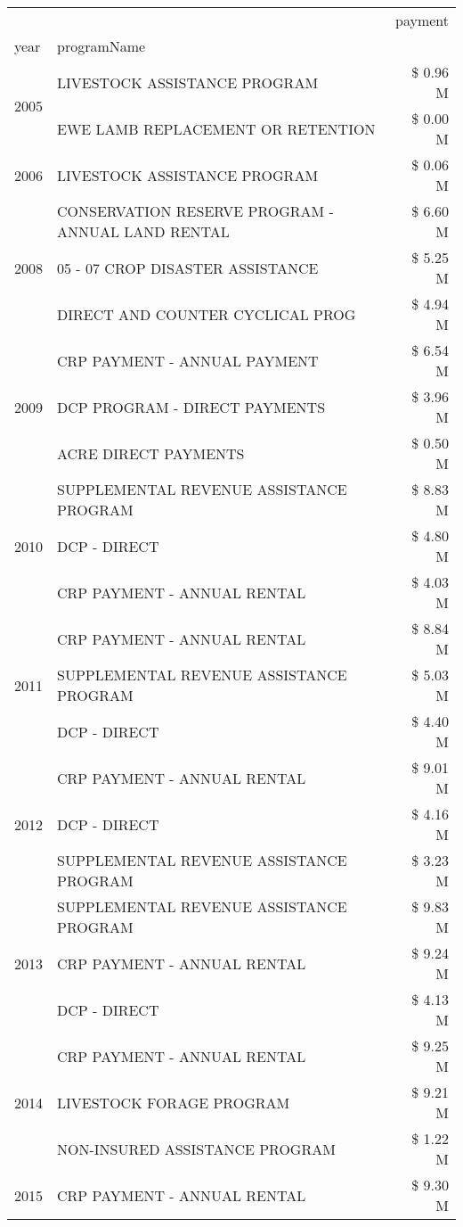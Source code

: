 \begin{tabular}{llr}
\toprule
 &  & payment \\
year & programName &  \\
\midrule
\multirow[t]{2}{*}{2005} & LIVESTOCK ASSISTANCE PROGRAM & \$ 0.96 M \\
 & EWE LAMB REPLACEMENT OR RETENTION & \$ 0.00 M \\
\cline{1-3}
2006 & LIVESTOCK ASSISTANCE PROGRAM & \$ 0.06 M \\
\cline{1-3}
\multirow[t]{3}{*}{2008} & CONSERVATION RESERVE PROGRAM - ANNUAL LAND RENTAL & \$ 6.60 M \\
 & 05 - 07 CROP DISASTER ASSISTANCE & \$ 5.25 M \\
 & DIRECT AND COUNTER CYCLICAL PROG & \$ 4.94 M \\
\cline{1-3}
\multirow[t]{3}{*}{2009} & CRP PAYMENT - ANNUAL PAYMENT & \$ 6.54 M \\
 & DCP PROGRAM - DIRECT PAYMENTS & \$ 3.96 M \\
 & ACRE DIRECT PAYMENTS & \$ 0.50 M \\
\cline{1-3}
\multirow[t]{3}{*}{2010} & SUPPLEMENTAL REVENUE ASSISTANCE PROGRAM & \$ 8.83 M \\
 & DCP - DIRECT & \$ 4.80 M \\
 & CRP PAYMENT - ANNUAL RENTAL & \$ 4.03 M \\
\cline{1-3}
\multirow[t]{3}{*}{2011} & CRP PAYMENT - ANNUAL RENTAL & \$ 8.84 M \\
 & SUPPLEMENTAL REVENUE ASSISTANCE PROGRAM & \$ 5.03 M \\
 & DCP - DIRECT & \$ 4.40 M \\
\cline{1-3}
\multirow[t]{3}{*}{2012} & CRP PAYMENT - ANNUAL RENTAL & \$ 9.01 M \\
 & DCP - DIRECT & \$ 4.16 M \\
 & SUPPLEMENTAL REVENUE ASSISTANCE PROGRAM & \$ 3.23 M \\
\cline{1-3}
\multirow[t]{3}{*}{2013} & SUPPLEMENTAL REVENUE ASSISTANCE PROGRAM & \$ 9.83 M \\
 & CRP PAYMENT - ANNUAL RENTAL & \$ 9.24 M \\
 & DCP - DIRECT & \$ 4.13 M \\
\cline{1-3}
\multirow[t]{3}{*}{2014} & CRP PAYMENT - ANNUAL RENTAL & \$ 9.25 M \\
 & LIVESTOCK FORAGE PROGRAM & \$ 9.21 M \\
 & NON-INSURED ASSISTANCE PROGRAM & \$ 1.22 M \\
\cline{1-3}
\multirow[t]{3}{*}{2015} & CRP PAYMENT - ANNUAL RENTAL & \$ 9.30 M \\

\end{tabular}
